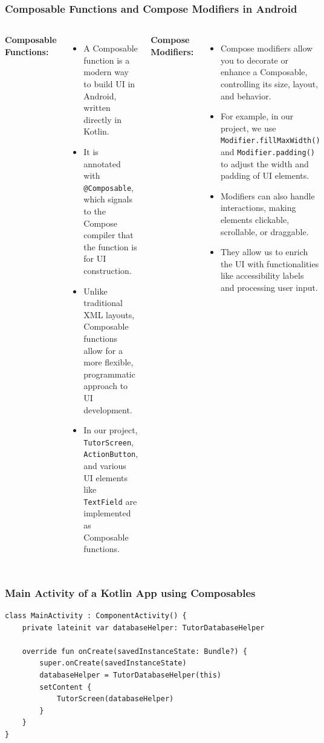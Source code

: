 \documentclass[pdf,
serif,
compress,
xcolor=table,
dvipsnames,
spanish,
aspectratio=169]{beamer}
\begin{document}
\begin{frame}
\frametitle{Composable Functions and Compose Modifiers in Android}
\begin{columns}
\textbf{Composable Functions:}
\begin{itemize}\tiny
    \item A Composable function is a modern way to build UI in Android, written directly in Kotlin. 
    \item It is annotated with \texttt{@Composable}, which signals to the Compose compiler that the function is for UI construction.
    \item Unlike traditional XML layouts, Composable functions allow for a more flexible, programmatic approach to UI development.
    \item In our project, \texttt{TutorScreen}, \texttt{ActionButton}, and various UI elements like \texttt{TextField} are implemented as Composable functions.
\end{itemize}

\textbf{Compose Modifiers:} 
\begin{itemize}\tiny
    \item Compose modifiers allow you to decorate or enhance a Composable, controlling its size, layout, and behavior.
    \item For example, in our project, we use \texttt{Modifier.fillMaxWidth()} and \texttt{Modifier.padding()} to adjust the width and padding of UI elements.
    \item Modifiers can also handle interactions, making elements clickable, scrollable, or draggable.
    \item They allow us to enrich the UI with functionalities like accessibility labels and processing user input.
\end{itemize}
\end{columns}
\end{frame}


\begin{frame}[fragile]
    \frametitle{Main Activity of a Kotlin App using Composables}
\begin{verbatim}
class MainActivity : ComponentActivity() {
    private lateinit var databaseHelper: TutorDatabaseHelper

    override fun onCreate(savedInstanceState: Bundle?) {
        super.onCreate(savedInstanceState)
        databaseHelper = TutorDatabaseHelper(this)
        setContent {
            TutorScreen(databaseHelper)
        }
    }
}
\end{verbatim}
\end{frame}
\end{document}
